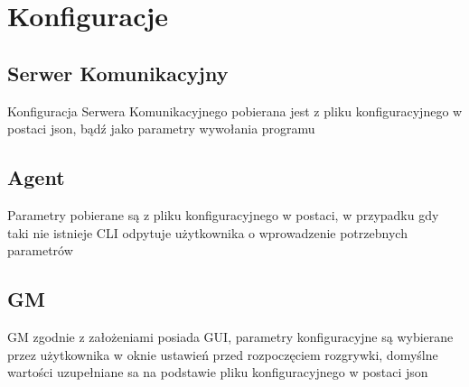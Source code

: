 \documentclass[./../Dokumentacja.tex]{subfiles}
\begin{document}
\section{Konfiguracje}
\label{sec:Konfiguracje}
\subsection{Serwer Komunikacyjny}
Konfiguracja Serwera Komunikacyjnego pobierana jest z pliku konfiguracyjnego w postaci json,
bądź jako parametry wywołania programu

\subsection{Agent}
Parametry pobierane są z pliku konfiguracyjnego w postaci, w przypadku gdy taki nie istnieje
CLI odpytuje użytkownika o wprowadzenie potrzebnych parametrów

\subsection{GM}
GM zgodnie z założeniami posiada GUI, parametry konfiguracyjne są wybierane przez użytkownika w
oknie ustawień przed rozpoczęciem rozgrywki, domyślne wartości uzupełniane sa na podstawie pliku
konfiguracyjnego w postaci json

\end{document}
